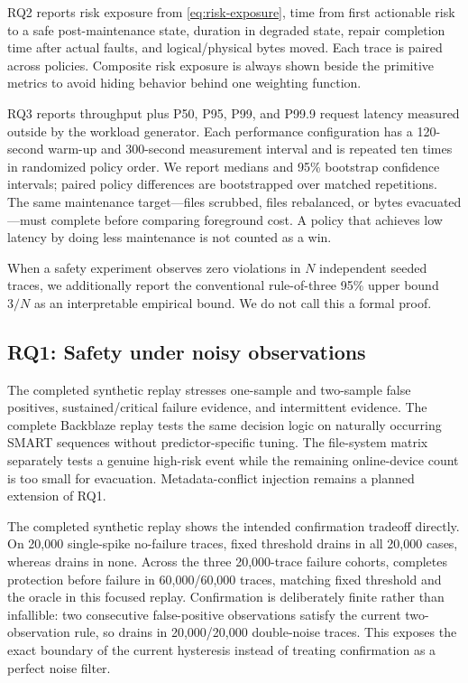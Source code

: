 RQ2 reports risk exposure from \cref{eq:risk-exposure}, time from first actionable risk to a safe post-maintenance state, duration in degraded state, repair completion time after actual faults, and logical/physical bytes moved. Each trace is paired across policies. Composite risk exposure is always shown beside the primitive metrics to avoid hiding behavior behind one weighting function.

RQ3 reports throughput plus P50, P95, P99, and P99.9 request latency measured outside \autopilot{} by the workload generator. Each performance configuration has a 120-second warm-up and 300-second measurement interval and is repeated ten times in randomized policy order. We report medians and 95\% bootstrap confidence intervals; paired policy differences are bootstrapped over matched repetitions. The same maintenance target---files scrubbed, files rebalanced, or bytes evacuated---must complete before comparing foreground cost. A policy that achieves low latency by doing less maintenance is not counted as a win.

When a safety experiment observes zero violations in $N$ independent seeded traces, we additionally report the conventional rule-of-three 95\% upper bound $3/N$ as an interpretable empirical bound. We do not call this a formal proof.

\subsection{RQ1: Safety under noisy observations}
The completed synthetic replay stresses one-sample and two-sample false positives, sustained/critical failure evidence, and intermittent evidence. The complete Backblaze replay tests the same decision logic on naturally occurring SMART sequences without predictor-specific tuning. The file-system matrix separately tests a genuine high-risk event while the remaining online-device count is too small for evacuation. Metadata-conflict injection remains a planned extension of RQ1.



The completed synthetic replay shows the intended confirmation tradeoff directly. On 20,000 single-spike no-failure traces, fixed threshold drains in all 20,000 cases, whereas \autopilot{} drains in none. Across the three 20,000-trace failure cohorts, \autopilot{} completes protection before failure in 60,000/60,000 traces, matching fixed threshold and the oracle in this focused replay. Confirmation is deliberately finite rather than infallible: two consecutive false-positive observations satisfy the current two-observation rule, so \autopilot{} drains in 20,000/20,000 double-noise traces. This exposes the exact boundary of the current hysteresis instead of treating confirmation as a perfect noise filter.

